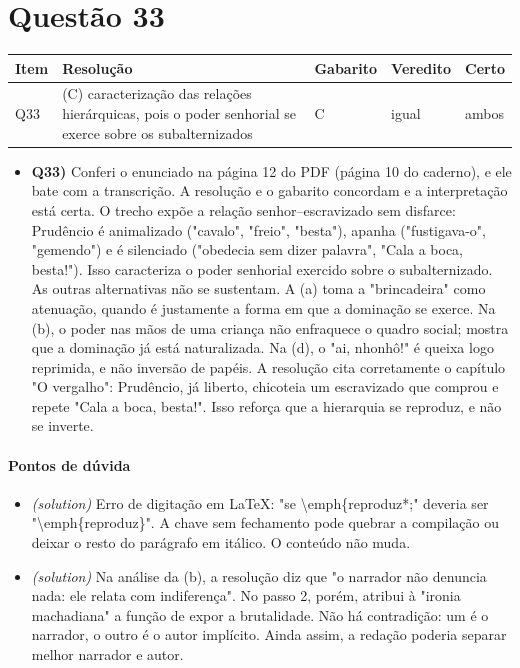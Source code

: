 \documentclass{article}%
\begin{document}
\section*{Questão 33}%
\begin{longtable}{@{}p{} p{} p{} p{} p{}@{}}\toprule Item & Resolução & Gabarito & Veredito & Certo \\ \midrule
Q33 & (C) caracterização das relações hierárquicas, pois o poder senhorial se exerce sobre os subalternizados & C & igual & ambos \\
\bottomrule\end{longtable}%
\begin{itemize}%
\item%
\textbf{Q33)} Conferi o enunciado na página 12 do PDF (página 10 do caderno), e ele bate com a transcrição. A resolução e o gabarito concordam e a interpretação está certa. O trecho expõe a relação senhor--escravizado sem disfarce: Prudêncio é animalizado ("cavalo", "freio", "besta"), apanha ("fustigava{-}o", "gemendo") e é silenciado ("obedecia sem dizer palavra", "Cala a boca, besta!"). Isso caracteriza o poder senhorial exercido sobre o subalternizado. As outras alternativas não se sustentam. A (a) toma a "brincadeira" como atenuação, quando é justamente a forma em que a dominação se exerce. Na (b), o poder nas mãos de uma criança não enfraquece o quadro social; mostra que a dominação já está naturalizada. Na (d), o "ai, nhonhô!" é queixa logo reprimida, e não inversão de papéis. A resolução cita corretamente o capítulo "O vergalho": Prudêncio, já liberto, chicoteia um escravizado que comprou e repete "Cala a boca, besta!". Isso reforça que a hierarquia se reproduz, e não se inverte.%
\end{itemize}%
\paragraph{Pontos de dúvida}%
\begin{itemize}%
\item%
\textit{(solution)} Erro de digitação em LaTeX: "se \textbackslash{}emph\{reproduz*;" deveria ser "\textbackslash{}emph\{reproduz\}". A chave sem fechamento pode quebrar a compilação ou deixar o resto do parágrafo em itálico. O conteúdo não muda.%
\item%
\textit{(solution)} Na análise da (b), a resolução diz que "o narrador não denuncia nada: ele relata com indiferença". No passo 2, porém, atribui à "ironia machadiana" a função de expor a brutalidade. Não há contradição: um é o narrador, o outro é o autor implícito. Ainda assim, a redação poderia separar melhor narrador e autor.%
\end{itemize}%
\end{document}
